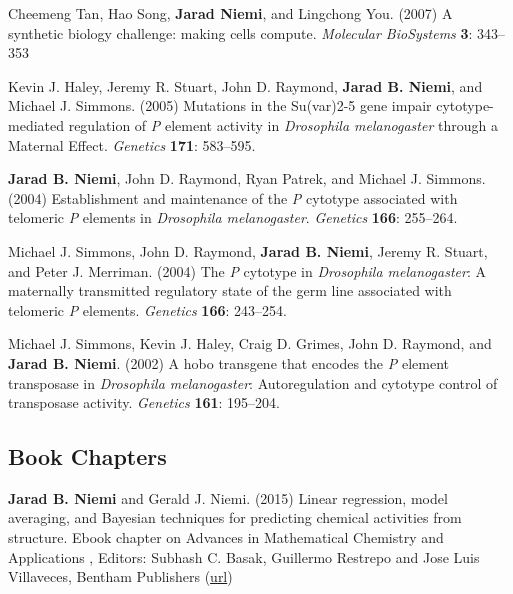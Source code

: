 \documentclass[overlapped,line]{res}
\begin{document}
\begin{resume}
Cheemeng Tan, Hao Song, {\bf Jarad Niemi}, and Lingchong You. (2007) A synthetic biology challenge: making cells compute. \emph{Molecular BioSystems}  {\bf 3}: 343--353

Kevin J. Haley, Jeremy R. Stuart, John D. Raymond, {\bf Jarad B. Niemi}, and Michael J. Simmons. (2005) Mutations in the Su(var)2-5 gene impair cytotype-mediated regulation of \emph{P} element activity in \emph{Drosophila melanogaster} through a Maternal Effect. \emph{Genetics} {\bf 171}: 583--595.


{\bf Jarad B. Niemi}, John D. Raymond, Ryan Patrek, and Michael J. Simmons. (2004) Establishment and maintenance of the \emph{P} cytotype associated with telomeric \emph{P} elements in \emph{Drosophila melanogaster}. \emph{Genetics} {\bf 166}: 255--264.

Michael J. Simmons, John D. Raymond, {\bf Jarad B. Niemi}, Jeremy R. Stuart, and Peter J. Merriman. (2004) The \emph{P} cytotype in \emph{Drosophila melanogaster}: A maternally transmitted regulatory state of the germ line associated with telomeric \emph{P} elements. \emph{Genetics} {\bf 166}: 243--254.


Michael J. Simmons, Kevin J. Haley, Craig D. Grimes, John D. Raymond, and {\bf Jarad B. Niemi}. (2002) A hobo transgene that encodes the \emph{P} element transposase in \emph{Drosophila melanogaster}: Autoregulation and cytotype control of transposase activity. \emph{Genetics} {\bf 161}: 195--204.





\subsection{\bf Book Chapters} \vspace{-0.2in}

{\bf Jarad B. Niemi} and Gerald J. Niemi. (2015) Linear regression, model averaging, and Bayesian techniques for predicting chemical activities from structure. Ebook chapter on Advances in Mathematical Chemistry and Applications
, Editors: Subhash C. Basak, Guillermo Restrepo and Jose Luis Villaveces, Bentham Publishers (\href{http://www.eurekaselect.com/132675/chapter/linear-regression%2C-model-averaging%2C-and-bayesian-techniques-for-predicting-chemical-activities-from-structur}{url})


\end{resume}
\end{document}
